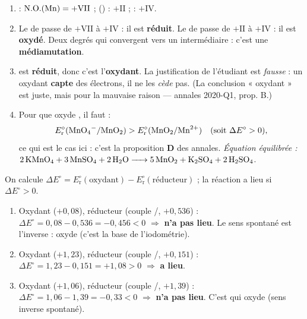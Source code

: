 \documentclass[11pt,a4paper]{article}
\newcommand{\NO}{\ensuremath{\mathrm{N.O.}}}
\newcommand{\Ered}{\ensuremath{E_{\mathrm{r}}^{\circ}}}
\begin{document}
\begin{corr}
\begin{enumerate}[label=\textbf{\alph*)},leftmargin=2.2em,topsep=2pt,itemsep=2pt]
  \item {} : $\NO(\ce{Mn})=+\mathrm{VII}$ ;  () : $+\mathrm{II}$ ;  : $+\mathrm{IV}$.
  \item Le  de  passe de $+\mathrm{VII}$ à $+\mathrm{IV}$ : il est \textbf{réduit}.
        Le  de  passe de $+\mathrm{II}$ à $+\mathrm{IV}$ : il est \textbf{oxydé}.
        Deux degrés qui convergent vers un intermédiaire : c'est une \textbf{médiamutation}.
  \item {} est \textbf{réduit}, donc c'est l'\textbf{oxydant}. La justification de l'étudiant est
        \emph{fausse} : un oxydant \textbf{capte} des électrons, il ne les \emph{cède} pas.
        (La conclusion « oxydant » est juste, mais pour la mauvaise raison — annales 2020-Q1, prop. B.)
  \item Pour que  oxyde , il faut :
        \[
        \Ered(\ce{MnO4^-}/\ce{MnO2}) > \Ered(\ce{MnO2}/\ce{Mn^{2+}}) \quad(\text{soit } \Delta E^{\circ}>0),
        \]
        ce qui est le cas ici : c'est la proposition \textbf{D} des annales. \emph{Équation équilibrée :}
        $\ce{2 KMnO4 + 3 MnSO4 + 2 H2O -> 5 MnO2 + K2SO4 + 2 H2SO4}$.
\end{enumerate}
\end{corr}

\begin{corr}
On calcule $\Delta E^{\circ}=\Ered(\text{oxydant}) - \Ered(\text{réducteur})$ ; la réaction a lieu si $\Delta E^{\circ}>0$.
\begin{enumerate}[label=\textbf{\alph*)},leftmargin=2.2em,topsep=2pt,itemsep=2pt]
  \item Oxydant  ($+0{,}08$), réducteur  (couple /, $+0{,}536$) :
        $\Delta E^{\circ}=0{,}08-0{,}536=-0{,}456<0$ $\Rightarrow$ \textbf{n'a pas lieu}. Le sens spontané est l'inverse :
         oxyde  (c'est la base de l'iodométrie).
  \item Oxydant  ($+1{,}23$), réducteur  (couple /, $+0{,}151$) :
        $\Delta E^{\circ}=1{,}23-0{,}151=+1{,}08>0$ $\Rightarrow$ \textbf{a lieu}.
  \item Oxydant  ($+1{,}06$), réducteur  (couple /, $+1{,}39$) :
        $\Delta E^{\circ}=1{,}06-1{,}39=-0{,}33<0$ $\Rightarrow$ \textbf{n'a pas lieu}. C'est  qui oxyde
         (sens inverse spontané).
\end{enumerate}
\end{corr}
\end{document}
